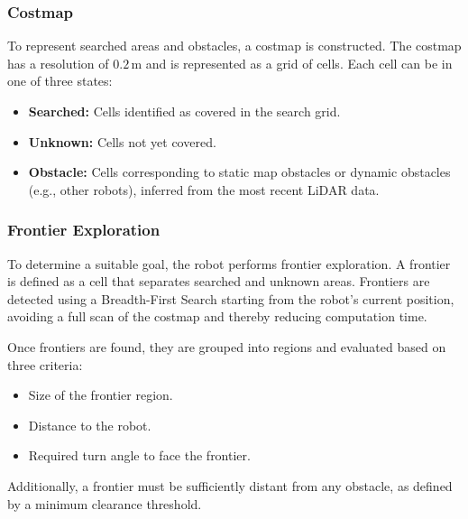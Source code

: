 \subsubsection{Costmap}\label{sec:costmap}
To represent searched areas and obstacles, a costmap is constructed. 
The costmap has a resolution of $0.2\,\text{m}$ and is represented as a grid of cells. Each cell can be in one of three states:
\begin{itemize}
  \item \textbf{Searched:} Cells identified as covered in the search grid.
  \item \textbf{Unknown:} Cells not yet covered.
  \item \textbf{Obstacle:} Cells corresponding to static map obstacles or dynamic obstacles (e.g., other robots), inferred from the most recent LiDAR data.
\end{itemize}

\subsubsection{Frontier Exploration}\label{sec:frontier_exploration}
To determine a suitable goal, the robot performs frontier exploration.
A frontier is defined as a cell that separates searched and unknown areas.
Frontiers are detected using a Breadth-First Search starting from the robot’s current position, avoiding a full scan of the costmap and thereby reducing computation time.

Once frontiers are found, they are grouped into regions and evaluated based on three criteria:
\begin{itemize}
  \item Size of the frontier region.
  \item Distance to the robot.
  \item Required turn angle to face the frontier.
\end{itemize}
Additionally, a frontier must be sufficiently distant from any obstacle, as defined by a minimum clearance threshold.

